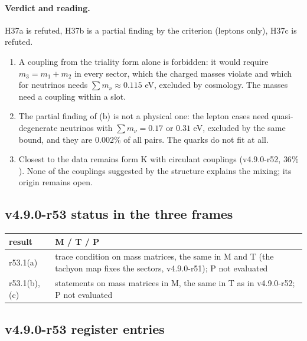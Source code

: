 \paragraph{Verdict and reading.}
H37a is refuted, H37b is a partial finding by the criterion (leptons only), H37c is refuted.
\begin{enumerate}[leftmargin=2em]
\item A coupling from the triality form alone is forbidden: it would require \(m_3=m_1+m_2\) in every sector, which the charged masses violate and
which for neutrinos needs \(\sum m_\nu\approx0.115\) eV, excluded by cosmology.  The masses need a coupling within a slot.
\item The partial finding of (b) is not a physical one: the lepton cases need quasi-degenerate neutrinos with \(\sum m_\nu=0.17\) or \(0.31\) eV,
excluded by the same bound, and they are \(0.002\%\) of all pairs.  The quarks do not fit at all.
\item Closest to the data remains form K with circulant couplings (v4.9.0-r52, \(36\%\)).  None of the couplings suggested by the structure explains
the mixing; its origin remains open.
\end{enumerate}

\subsection*{v4.9.0-r53 status in the three frames}
\label{subsec:v490-r53-frames}

\begin{center}
\small
\begin{tabular}{@{}>{\raggedright\arraybackslash}p{}>{\raggedright\arraybackslash}p{}@{}}
\toprule
result & M / T / P\\
\midrule
r53.1(a) & trace condition on mass matrices, the same in M and T (the tachyon map fixes the sectors, v4.9.0-r51); P not evaluated\\
r53.1(b), (c) & statements on mass matrices in M, the same in T as in v4.9.0-r52; P not evaluated\\
\bottomrule
\end{tabular}
\end{center}

\subsection*{v4.9.0-r53 register entries}
\label{subsec:v490-r53-register}

